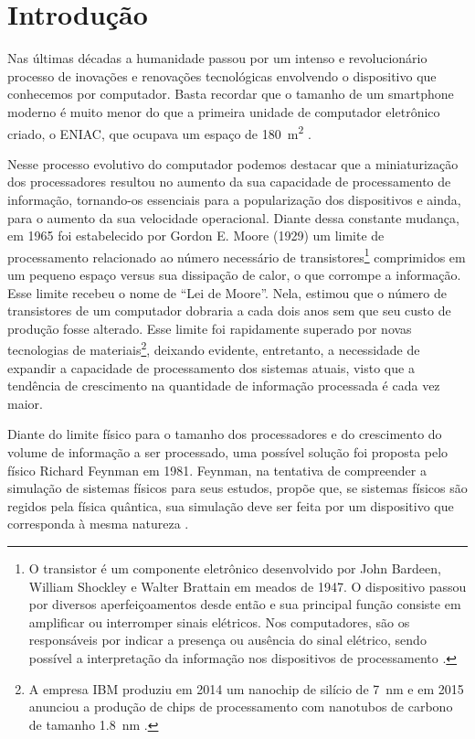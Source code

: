 \chapter{Introdução}

Nas últimas décadas a humanidade passou por um intenso e revolucionário processo de inovações e renovações tecnológicas envolvendo o dispositivo que conhecemos por computador. Basta recordar que o tamanho de um smartphone moderno é muito menor do que a primeira unidade de computador eletrônico criado, o ENIAC, que ocupava um espaço de \SI{180}{\square\meter} \cite{eniac}.

Nesse processo evolutivo do computador podemos destacar que a miniaturização dos processadores resultou no aumento da sua capacidade de processamento de informação, tornando-os essenciais para a popularização dos dispositivos e ainda, para o aumento da sua velocidade operacional. Diante dessa constante mudança, em 1965 foi estabelecido por Gordon E. Moore (1929) um limite de processamento relacionado ao número necessário de transistores\footnote{O transistor é um componente eletrônico desenvolvido por John Bardeen, William Shockley e Walter Brattain em meados de 1947. O dispositivo passou por diversos aperfeiçoamentos desde então e sua principal função consiste em amplificar ou interromper sinais elétricos. Nos computadores, são os responsáveis por indicar a presença ou ausência do sinal elétrico, sendo possível a interpretação da informação nos dispositivos de processamento \cite{transistor}.} comprimidos em um pequeno espaço versus sua dissipação de calor, o que corrompe a informação. Esse limite recebeu o nome de ``Lei de Moore''. Nela, \textcite{moore} estimou que o número de transistores de um computador dobraria a cada dois anos sem que seu custo de produção fosse alterado. Esse limite foi rapidamente superado por novas tecnologias de materiais\footnote{A empresa IBM produziu em 2014 um nanochip de silício de \SI{7}{\nano\meter} e em 2015 anunciou a produção de chips de processamento com nanotubos de carbono de tamanho \SI{1.8}{\nano\meter} \cite{chipibm}.}, deixando evidente, entretanto, a necessidade de expandir a capacidade de processamento dos sistemas atuais, visto que a tendência de crescimento na quantidade de informação processada é cada vez maior.

Diante do limite físico para o tamanho dos processadores e do crescimento do volume de informação a ser processado, uma possível solução foi proposta pelo físico Richard Feynman em 1981. Feynman, na tentativa de compreender a simulação de sistemas físicos para seus estudos, propõe que, se sistemas físicos são regidos pela física quântica, sua simulação deve ser feita por um dispositivo que corresponda à mesma natureza \cite{caldeira}.

